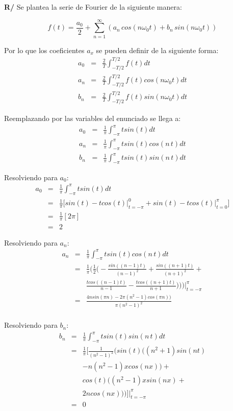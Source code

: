 \documentclass[twocolumn]{article}
\begin{document}
\textbf{R/} Se plantea la serie de Fourier de la siguiente manera:

$$f(t) = \frac{a_0}{2} + \sum_{n=1}^\infty\left(a_n\,cos(n\omega_0t) + b_n\,sin(n\omega_0t)\right)$$

Por lo que los coeficientes $a_x$ se pueden definir de la siguiente forma:
\begin{eqnarray*}
a_0 &=& \frac{2}{T}\int_{-T/2}^{T/2}f(t)dt\\
a_n &=& \frac{2}{T}\int_{-T/2}^{T/2}f(t)cos(n\omega_0t)dt\\
b_n &=& \frac{2}{T}\int_{-T/2}^{T/2}f(t)sin(n\omega_0t)dt
\end{eqnarray*}

Reemplazando por las variables del enunciado se llega a:
\begin{eqnarray*}
a_0 &=& \frac{1}{\pi}\int_{-\pi}^{\pi}tsin(t)dt\\
a_n &=& \frac{1}{\pi}\int_{-\pi}^{\pi}tsin(t)cos(n\,t)dt\\
b_n &=& \frac{1}{\pi}\int_{-\pi}^{\pi}tsin(t)sin(n\,t)dt
\end{eqnarray*}

Resolviendo para $a_0$:
\begin{eqnarray*}
a_0 &=& \frac{1}{\pi}\int_{-\pi}^{\pi}tsin(t)dt\\
&=& \frac{1}{\pi} \bigg[ sin(t) -tcos(t)\bigg|_{t=-\pi}^{0} + sin(t) -tcos(t)\bigg|_{t=0}^{\pi} \bigg] \\
&=& \frac{1}{\pi} [2\pi]\\
&=& 2
\end{eqnarray*}

Resolviendo para $a_n$:
\begin{eqnarray*}
a_n &=& \frac{1}{\pi}\int_{-\pi}^{\pi}tsin(t)cos(n\,t)dt\\
&=& \frac{1}{\pi} \bigg(\frac{1}{2}\bigg(-\frac{sin((n-1)t)}{(n-1)^{2}} + \frac{sin((n+1)t)}{(n+1)^{2}}+ \\ 
& & \frac{tcos((n-1)t)}{n-1} - \frac{tcos((n+1)t)}{n+1})\bigg)\bigg)\bigg|_{t=-\pi}^{\pi}\\
&=& \frac{4nsin(\pi n)-2\pi(n^{2}-1)cos(\pi n))}{\pi(n^{2}- 1)^{2}}\\
\end{eqnarray*}

Resolviendo para $b_n$:
\begin{eqnarray*}
b_n &=& \frac{1}{\pi}\int_{-\pi}^{\pi}tsin(t)sin(n\,t)dt\\
&=& \frac{1}{\pi} \bigg[\frac{1}{(n^{2}-1)^{2}}(sin(t)((n^{2}+1)sin(nt) \\
& & -n(n^{2}-1)xcos(nx))+ \\
& & cos(t)((n^{2}-1)xsin(nx) + \\
& &2ncos(nx)))\bigg]\bigg|_{t=-\pi}^{\pi}\\
&=& 0
\end{eqnarray*}
\end{document}
